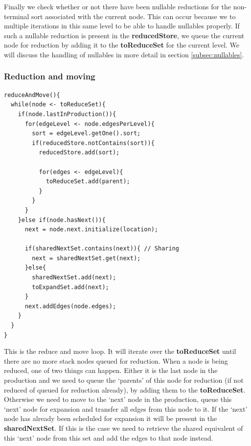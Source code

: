 \documentclass[a4paper,10pt]{article}
\begin{document}
Finally we check whether or not there have been nullable reductions for the non-terminal sort associated with the current node. This can occur because we to multiple iterations in this same level to be able to handle nullables properly. If such a nullable reduction is present in the {\bf reducedStore}, we queue the current node for reduction by adding it to the {\bf toReduceSet} for the current level. We will discuss the handling of nullables in more detail in section \ref{subsec:nullables}.

\pagebreak
\subsubsection{Reduction and moving}
{\small
\begin{verbatim}
reduceAndMove(){
  while(node <- toReduceSet){
    if(node.lastInProduction()){
      for(edgeLevel <- node.edgesPerLevel){
        sort = edgeLevel.getOne().sort;
        if(reducedStore.notContains(sort)){
          reducedStore.add(sort);
          
          for(edges <- edgeLevel){
            toReduceSet.add(parent);
          }
        }
      }
    }else if(node.hasNext()){
      next = node.next.initialize(location);
      
      if(sharedNextSet.contains(next)){ // Sharing
        next = sharedNextSet.get(next);
      }else{
        sharedNextSet.add(next);
        toExpandSet.add(next);
      }
      next.addEdges(node.edges);
    }
  }
}
\end{verbatim}
}

This is the reduce and move loop. It will iterate over the {\bf toReduceSet} until there are no more stack nodes queued for reduction. When a node is being reduced, one of two things can happen. Either it is the last node in the production and we need to queue the `parents' of this node for reduction (if not reduced of queued for reduction already), by adding them to the {\bf toReduceSet}. Otherwise we need to move to the `next' node in the production, queue this `next' node for expansion and transfer all edges from this node to it. If the `next' node has already been scheduled for expansion it will be present in the {\bf sharedNextSet}. If this is the case we need to retrieve the shared equivalent of this `next' node from this set and add the edges to that node instead.
\end{document}
